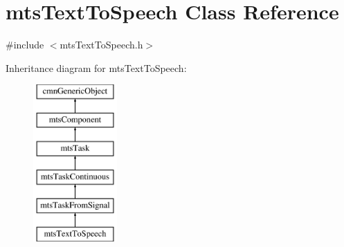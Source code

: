 \hypertarget{classmts_text_to_speech}{}\section{mts\+Text\+To\+Speech Class Reference}
\label{classmts_text_to_speech}


{\ttfamily \#include $<$mts\+Text\+To\+Speech.\+h$>$}

Inheritance diagram for mts\+Text\+To\+Speech\+:\begin{figure}[H]
\begin{center}
\leavevmode
\includegraphics[height=6.000000cm]{d4/d58/classmts_text_to_speech}
\end{center}
\end{figure}
